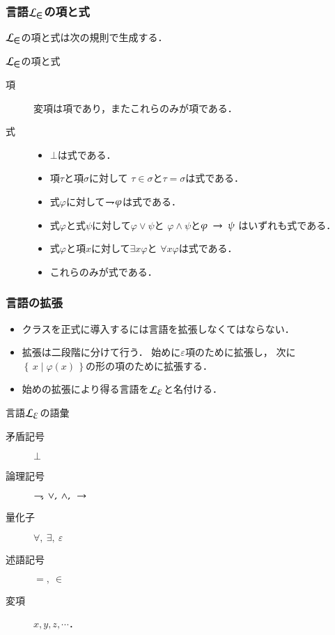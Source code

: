 \documentclass[dvipdfmx,10pt,notheorems]{beamer}
\theoremstyle{definition}
\newcommand{\lang}[1]{\mathcal{L}_{\scalebox{1.2}{$#1$}}} %
\newcommand{\Set}[2]{\left\{\, #1 \mid #2\, \right\}} %
\newcommand{\negation}{\rightharpoondown\hspace{-0.25em}} %
\newcommand{\rarrow}{\hspace{0.25em}\rightarrow\hspace{0.25em}} %
\begin{document}
\begin{frame}\frametitle{言語$\lang{\in}$の項と式}
	$\lang{\in}$の項と式は次の規則で生成する．
	
	\begin{exampleblock}{$\lang{\in}$の項と式}
		\begin{description}
			\item[項] 変項は項であり，またこれらのみが項である．
				
			\item[式] 
				\begin{itemize}
					\item $\bot$は式である．
					\item 項$\tau$と項$\sigma$に対して
						$\tau \in \sigma$と$\tau = \sigma$は式である．
					\item 式$\varphi$に対して$\negation \varphi$は式である．
					\item 式$\varphi$と式$\psi$に対して$\varphi \vee \psi$と
						$\varphi \wedge \psi$と$\varphi \rarrow \psi$
						はいずれも式である．
					\item 式$\varphi$と項$x$に対して$\exists x \varphi$と
						$\forall x \varphi$は式である．
					\item これらのみが式である．
				\end{itemize}
		\end{description}
	\end{exampleblock}
\end{frame}

\begin{frame}\frametitle{言語の拡張}
	\begin{itemize}
		\item クラスを正式に導入するには言語を拡張しなくてはならない．
		\item 拡張は二段階に分けて行う．
			始めに$\varepsilon$項のために拡張し，
			次に$\Set{x}{\varphi(x)}$の形の項のために拡張する．
			
		\item 始めの拡張により得る言語を$\lang{\varepsilon}$と名付ける．
	\end{itemize}

	\begin{exampleblock}{言語$\lang{\varepsilon}$の語彙}
		\begin{description}
			\item[矛盾記号] $\bot$
			\item[論理記号] $\negation,\ \vee,\ \wedge,\ \rarrow$
			\item[量化子] $\forall,\ \exists,\ \varepsilon$
			\item[述語記号] $=,\ \in$
			\item[変項] $x,y,z,\cdots$．
		\end{description}
	\end{exampleblock}
\end{frame}
\end{document}
